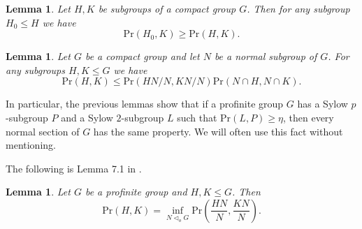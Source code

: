 \documentclass[12pt]{amsart}
\newtheorem{lemma}[theorem]{\bf Lemma}
\newcommand{\pr }{\mathrm{Pr} }
\begin{document}
\begin{lemma}\label{sub} 
Let $H,K$ be subgroups of a compact group $G$. Then for any subgroup $H_0 \le H$ we have 
\[\pr(H_0,K)\geq \pr(H,K).\]
\end{lemma}
\begin{lemma}\label{quot} 
 Let $G$ be a compact group and let $N$ be a normal subgroup of  $G$.  For any subgroups $H,K\leq G$ we have 
\[\pr(H,K)\leq \pr(HN/N,KN/N)\pr(N\cap H,N\cap K).\]
\end{lemma}

In particular, the previous lemmas show that if a profinite group $G$ has a Sylow $p$-subgroup $P$ and a Sylow $2$-subgroup $L$ such that $\pr(L,P)\ge \eta$, then every normal  section of $G$ has the same property. We will often use this fact without mentioning. 

The following is Lemma 7.1 in \cite{DGMS1}. 

\begin{lemma}\label{limit} 
Let $G$ be a profinite group and $H, K \le G$.  Then 
\[ \pr(H,K) = \inf_{N \lhd_o G} \pr \left(\frac{HN}{N},\frac{KN}{N}\right).\]
\end{lemma}\
\end{document}
